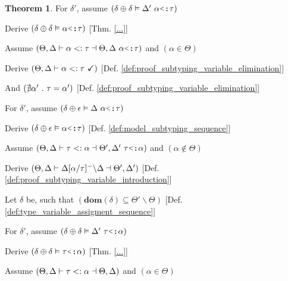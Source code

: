 \documentclass[acmsmall]{acmart}
\theoremstyle{definition}
\newtheorem{theorem}{Theorem}[section]
\begin{document}
\begin{theorem}
  \item \I \N For $\delta'$, assume $(
    \delta \oplus \delta \satisfies \Delta'\ \alpha \J{<:} \tau
  )$ 
  \item \I\I \N Derive $(
    \delta \oplus \delta \satisfies \alpha \J{<:} \tau
  )$ [Thm. \ref{...}]


  \item \N Assume $(
    \Theta, \Delta \entails 
    \alpha \subtypes \tau
    \given \Theta, \Delta\ \alpha \J{<:} \tau
  )$ and $(
    \alpha \in \Theta 
  )$
  \item \I \N Derive $(
    \Theta, \Delta \vdash \alpha <: \tau \ \checkmark
  )$ [Def. \ref{def:proof_subtyping_variable_elimination}]
  \item \I \N And $(
    \nexists \alpha'  \ .\  \tau = \alpha'
  )$ [Def. \ref{def:proof_subtyping_variable_elimination}]

  \item \I \N For $\delta'$, assume $(
    \delta \oplus \epsilon \satisfies \Delta\ \alpha \J{<:} \tau 
  )$ 
  \item \I\I \N Derive $(
    \delta \oplus \epsilon \satisfies \alpha \J{<:} \tau
  )$ [Def. \ref{def:model_subtyping_sequence}]


  \item \N Assume $(
    \Theta, \Delta \entails 
    \tau \subtypes \alpha \given \Theta', \Delta'\ \tau\J{<:}\alpha
  )$ and $(
    \alpha \notin \Theta
  )$
  \item \I \N Derive $(
    \Theta, \Delta \vdash 
    \Delta[\alpha\slash\tau]^{-} \backslash \Delta \dashv \Theta', \Delta'
  )$ [Def. \ref{def:proof_subtyping_variable_introduction}]

  \item \I \N Let $\delta$ be, such that $(
    \textbf{dom}(\delta) \subseteq \Theta' \backslash \Theta
  )$ [Def. \ref{def:type_variable_assigment_sequence}]

  \item \I \N For $\delta'$, assume $(
    \delta \oplus \delta \satisfies \Delta'\ \tau \J{<:} \alpha
  )$ 
  \item \I\I \N Derive $(
    \delta \oplus \delta \satisfies \tau \J{<:} \alpha
  )$ [Thm. \ref{...}]


  \item \N Assume $(
    \Theta, \Delta \vdash 
    \tau <: \alpha \dashv \Theta, \Delta
  )$ and $(
    \alpha \in \Theta
  )$


\end{theorem}
\end{document}
